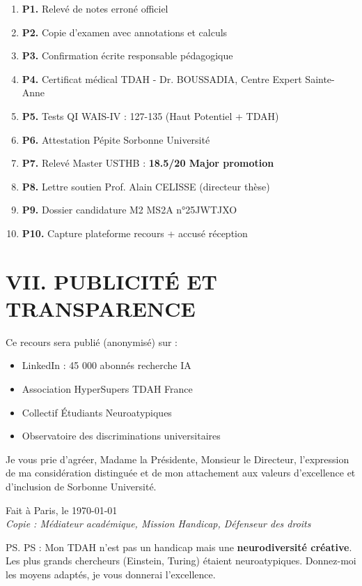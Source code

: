 \documentclass[12pt,french]{scrlttr2}
\begin{document}
\begin{letter}
\begin{enumerate}
\item \textbf{P1.} Relevé de notes erroné officiel
\item \textbf{P2.} Copie d'examen avec annotations et calculs
\item \textbf{P3.} Confirmation écrite responsable pédagogique
\item \textbf{P4.} \colorbox{yellow!20}{Certificat médical TDAH} - Dr. BOUSSADIA, Centre Expert Sainte-Anne
\item \textbf{P5.} \colorbox{yellow!20}{Tests QI} WAIS-IV : 127-135 (Haut Potentiel + TDAH)
\item \textbf{P6.} \colorbox{green!20}{Attestation Pépite} Sorbonne Université
\item \textbf{P7.} Relevé Master USTHB : \textbf{18.5/20 Major promotion}
\item \textbf{P8.} Lettre soutien Prof. Alain CELISSE (directeur thèse)
\item \textbf{P9.} Dossier candidature M2 MS2A n°25JWTJXO
\item \textbf{P10.} Capture plateforme recours + accusé réception
\end{enumerate}

\section*{VII. PUBLICITÉ ET TRANSPARENCE}

Ce recours sera publié (anonymisé) sur :
\begin{itemize}
\item LinkedIn : 45 000 abonnés recherche IA
\item Association HyperSupers TDAH France
\item Collectif Étudiants Neuroatypiques
\item Observatoire des discriminations universitaires
\end{itemize}

\vspace{0.5cm}

Je vous prie d'agréer, Madame la Présidente, Monsieur le Directeur, l'expression de ma considération distinguée et de mon attachement aux valeurs d'excellence et d'inclusion de Sorbonne Université.

\closing{Fait à Paris, le \today\\
\textit{Copie : Médiateur académique, Mission Handicap, Défenseur des droits}}

\ps{PS : Mon TDAH n'est pas un handicap mais une \textbf{neurodiversité créative}. Les plus grands chercheurs (Einstein, Turing) étaient neuroatypiques. Donnez-moi les moyens adaptés, je vous donnerai l'excellence.}


\end{letter}
\end{document}
